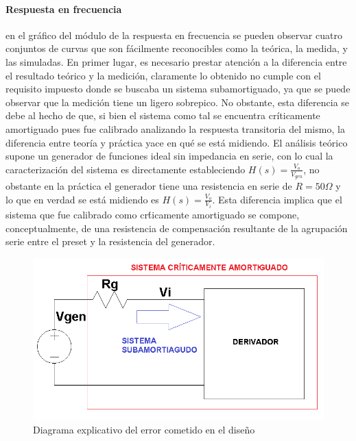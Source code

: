 \paragraph*{Respuesta en frecuencia} en el gr\'afico del m\'odulo de la respuesta en frecuencia se pueden observar cuatro conjuntos de curvas
que son f\'acilmente reconocibles como la te\'orica, la medida, y las simuladas. En primer lugar, es necesario prestar atenci\'on a la diferencia entre el resultado
te\'orico y la medici\'on, claramente lo obtenido no cumple con el requisito impuesto donde se buscaba un sistema subamortiguado, ya que se puede observar que la medici\'on 
tiene un ligero sobrepico. No obstante, esta diferencia se debe al hecho de que, si bien el sistema como tal se encuentra cr\'iticamente amortiguado pues fue calibrado analizando
la respuesta transitoria del mismo, la diferencia entre teor\'ia y pr\'actica yace en qu\'e se est\'a midiendo. El an\'alisis te\'orico supone un generador de funciones ideal
sin impedancia en serie, con lo cual la caracterizaci\'on del sistema es directamente estableciendo $H(s) = \frac{V_o}{V_{gen}}$, no obstante en la pr\'actica el generador tiene una resistencia
en serie de $R = 50 \Omega$ y lo que en verdad se est\'a midiendo es $H(s) = \frac{V_o}{V_i}$. Esta diferencia implica que el sistema que fue calibrado como cr\'ticamente amortiguado se compone, conceptualmente,
de una resistencia de compensaci\'on resultante de la agrupaci\'on serie entre el preset y la resistencia del generador.

\begin{figure}[H]
	\centering
	\includegraphics[scale=0.6]{Recursos/Integrador/correccion.png}
	\caption{Diagrama explicativo del error cometido en el dise\~no}
	\label{fig:derivador_correccion}
\end{figure}

